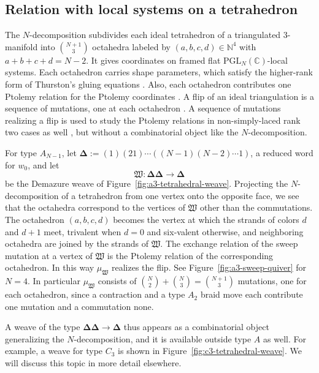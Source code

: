 \documentclass[10pt,a4paper]{article}
\theoremstyle{definition}
\theoremstyle{remark}
\newcommand{\C}{\mathbb C}
\newcommand{\fW}{\mathfrak W}
\begin{document}
\subsection{Relation with local systems on a tetrahedron}
\label{subsec:tetrahedron-local-systems}

The \(N\)-decomposition subdivides each ideal tetrahedron of a triangulated
\(3\)-manifold into \(\binom{N+1}{3}\) octahedra labeled by
\((a,b,c,d)\in\mathbb N^4\) with \(a+b+c+d=N-2\).  It gives coordinates on
framed flat \(\mathrm{PGL}_N(\C)\)-local systems.  Each octahedron carries
shape parameters, which satisfy the higher-rank form of Thurston's gluing
equations
\cite{GaroufalidisGoernerZickert2015,DimofteGabellaGoncharov2016}.
Also, each octahedron contributes one Ptolemy relation
for the Ptolemy coordinates \cite{GaroufalidisThurstonZickert2015}.  
A flip of an ideal triangulation is a sequence of mutations, one at
each octahedron \cite{FockGoncharov2006,DimofteGabellaGoncharov2016}.
A sequence of mutations realizing a flip is used to study the Ptolemy relations
in non-simply-laced rank two cases as well \cite{Zickert2020}, but without a combinatorial object
like the \(N\)-decomposition.

For type \(A_{N-1}\), let
\(\boldsymbol\Delta:=(1)(21)\cdots((N-1)(N-2)\cdots1)\), a reduced word
for \(w_0\), and let
\[
 \fW:\boldsymbol\Delta\boldsymbol\Delta\longrightarrow\boldsymbol\Delta
\]
be the Demazure weave of Figure~\ref{fig:a3-tetrahedral-weave}.
Projecting the \(N\)-decomposition of a tetrahedron from one vertex onto the
opposite face, we see that the octahedra correspond to the vertices of \(\fW\) other than the
commutations. The octahedron \((a,b,c,d)\) becomes the vertex at which the
strands of colors \(d\) and \(d+1\) meet, trivalent when \(d=0\) and six-valent
otherwise, and neighboring octahedra are joined by the strands of \(\fW\).
The exchange relation of the sweep mutation at a vertex of \(\fW\) is the
Ptolemy relation of the corresponding octahedron.  In this way \(\mu_\fW\) realizes the
flip.  See Figure~\ref{fig:a3-sweep-quiver} for \(N=4\).  In particular \(\mu_\fW\) consists of
\(\binom N2+\binom N3=\binom{N+1}{3}\) mutations, one for each octahedron,
since a contraction and a type \(A_2\) braid move each contribute one mutation
and a commutation none.

A weave of the type
\(\boldsymbol\Delta\boldsymbol\Delta\to\boldsymbol\Delta\) thus appears as a
combinatorial object generalizing the \(N\)-decomposition, and it is available
outside type \(A\) as well.  For example, a weave for type \(C_3\) is shown in
Figure~\ref{fig:c3-tetrahedral-weave}.  We will discuss this topic in more detail
elsewhere.
\end{document}
